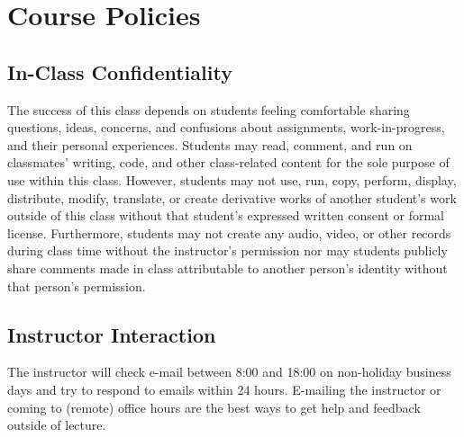 \documentclass[10pt]{memoir}
\begin{document}
\clearpage

\section{\textbf{Course Policies}}


\subsection{In-Class Confidentiality}
The success of this class depends on students feeling comfortable sharing questions, ideas, concerns, and confusions about assignments, work-in-progress, and their personal experiences. Students may read, comment, and run on classmates' writing, code, and other class-related content for the sole purpose of use within this class. However, students may not use, run, copy, perform, display, distribute, modify, translate, or create derivative works of another student's work outside of this class without that student's expressed written consent or formal license. Furthermore, students may not create any audio, video, or other records during class time without the instructor's permission nor may students publicly share comments made in class attributable to another person's identity without that person's permission.


\subsection{Instructor Interaction}
The instructor will check e-mail between 8:00 and 18:00 on non-holiday business days and try to respond to emails within 24 hours. E-mailing the instructor or coming to (remote) office hours are the best ways to get help and feedback outside of lecture.
\end{document}

